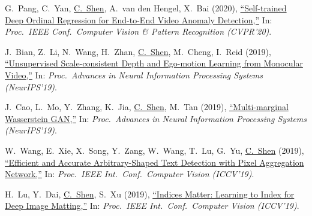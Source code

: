 \documentclass[9pt, a4paper]{article}
\newcommand{\years}[1]{\marginnote{\scriptsize #1}}
\def\highlight{\uline}
\begin{document}
\medskip

\years{2020} G.~Pang, C.~Yan, \highlight{C.~Shen}, A.~van den Hengel, X.~Bai (2020),
\href{http://www.google.com/search?lr=&ie=UTF-8&oe=UTF-8&q=Self-trained+Deep+Ordinal+Regression+for+End-to-End+Video+Anomaly+Detection+Guansong+Pang%2C+Cheng+Yan%2C+Chunhua+Shen%2C+Anton+van+den+Hengel%2C+Xiao+Bai}{``Self-trained Deep Ordinal Regression for End-to-End Video Anomaly Detection,{}''}
In: \emph{Proc.\ IEEE Conf.\  Computer Vision \& Pattern Recognition (CVPR'20)}.

\medskip

\years{2019} J.~Bian, Z.~Li, N.~Wang, H.~Zhan, \highlight{C.~Shen}, M.~Cheng, I.~Reid (2019),
\href{http://www.google.com/search?lr=&ie=UTF-8&oe=UTF-8&q=Unsupervised+Scale-consistent+Depth+and+Ego-motion+Learning+from+Monocular+Video+Jia-Wang+Bian%2C+Zhichao+Li%2C+Naiyan+Wang%2C+Huangying+Zhan%2C+Chunhua+Shen%2C+Ming-Ming+Cheng%2C+Ian+Reid}{``Unsupervised Scale-consistent Depth and Ego-motion Learning from Monocular Video,{}''}
In: \emph{Proc.\ Advances in Neural Information Processing Systems (NeurIPS'19)}.

\medskip

\years{2019} J.~Cao, L.~Mo, Y.~Zhang, K.~Jia, \highlight{C.~Shen}, M.~Tan (2019),
\href{http://www.google.com/search?lr=&ie=UTF-8&oe=UTF-8&q=Multi-marginal+Wasserstein+GAN+Jiezhang+Cao%2C+Langyuan+Mo%2C+Yifan+Zhang%2C+Kui+Jia%2C+Chunhua+Shen%2C+Mingkui+Tan}{``Multi-marginal Wasserstein {GAN},{}''}
In: \emph{Proc.\ Advances in Neural Information Processing Systems (NeurIPS'19)}.

\medskip

\years{2019} W.~Wang, E.~Xie, X.~Song, Y.~Zang, W.~Wang, T.~Lu, G.~Yu, \highlight{C.~Shen} (2019),
\href{http://www.google.com/search?lr=&ie=UTF-8&oe=UTF-8&q=Efficient+and+Accurate+Arbitrary-Shaped+Text+Detection+with+Pixel+Aggregation+Network+Wenhai+Wang%2C+Enze+Xie%2C+Xiaoge+Song%2C+Yuhang+Zang%2C+Wenjia+Wang%2C+Tong+Lu%2C+Gang+Yu%2C+Chunhua+Shen}{``Efficient and Accurate Arbitrary-Shaped Text Detection with Pixel Aggregation Network,{}''}
In: \emph{Proc.\ IEEE Int.\ Conf.\  Computer Vision (ICCV'19)}.

\medskip

\years{2019} H.~Lu, Y.~Dai, \highlight{C.~Shen}, S.~Xu (2019),
\href{http://www.google.com/search?lr=&ie=UTF-8&oe=UTF-8&q=Indices+Matter%3A+Learning+to+Index+for+Deep+Image+Matting+Hao+Lu%2C+Yutong+Dai%2C+Chunhua+Shen%2C+Songcen+Xu}{``Indices Matter: Learning to Index for Deep Image Matting,{}''}
In: \emph{Proc.\ IEEE Int.\ Conf.\  Computer Vision (ICCV'19)}.
\end{document}
